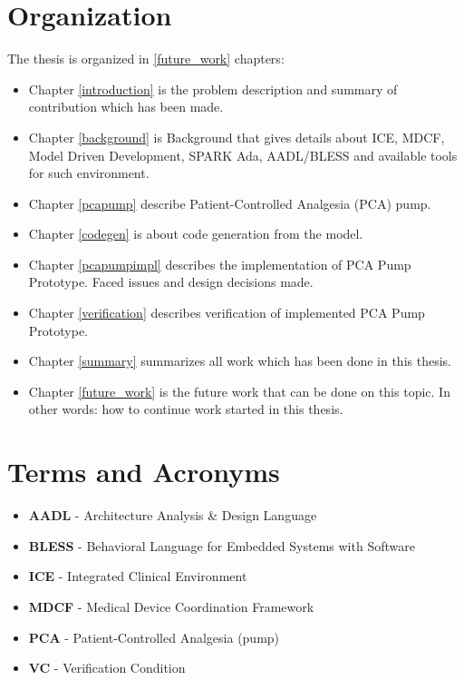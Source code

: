 \section{Organization}
\label{introduction:organization}
The thesis is organized in \ref{future_work} chapters:
\begin{itemize}
	\item Chapter \ref{introduction} is the problem description and summary of contribution which has been made. 
	\item Chapter \ref{background} is Background that gives details about ICE, MDCF, Model Driven Development, SPARK Ada, AADL/BLESS and available tools for such environment. 
	\item Chapter \ref{pcapump} describe Patient-Controlled Analgesia (PCA) pump.
	\item Chapter \ref{codegen} is about code generation from the model. 
	\item Chapter \ref{pcapumpimpl} describes the implementation of PCA Pump Prototype. Faced issues and design decisions made.
	\item Chapter \ref{verification} describes verification of implemented PCA Pump Prototype. 
	\item Chapter \ref{summary} summarizes all work which has been done in this thesis. 
	\item Chapter \ref{future_work} is the future work that can be done on this topic. In other words: how to continue work started in this thesis.
\end{itemize}


\section{Terms and Acronyms}
\label{introduction:terms}

\begin{itemize}
	\item \textbf{AADL} - Architecture Analysis \& Design Language
	\item \textbf{BLESS} - Behavioral Language for Embedded Systems with Software
	\item \textbf{ICE} - Integrated Clinical Environment
	\item \textbf{MDCF} - Medical Device Coordination Framework
	\item \textbf{PCA} - Patient-Controlled Analgesia (pump)
	\item \textbf{VC} - Verification Condition
\end{itemize}